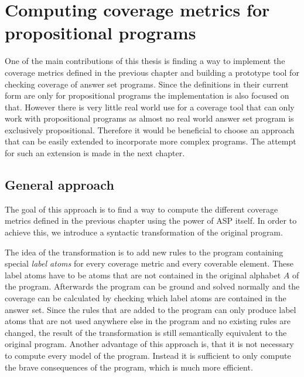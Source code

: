 \chapter{Computing coverage metrics for propositional programs}
\label{ch:Computing coverage metrics for propositional programs}
One of the main contributions of this thesis is finding a way to implement the coverage metrics defined in the previous chapter and building a prototype tool for checking coverage of answer set programs. Since the definitions in their current form are only for propositional programs the implementation is also focused on that. However there is very little real world use for a coverage tool that can only work with propositional programs as almost no real world answer set program is exclusively propositional. Therefore it would be beneficial to choose an approach that can be easily extended to incorporate more complex programs. The attempt for such an extension is made in the next chapter.

\begin{comment}
    - one of the main contributions of this thesis is finding a way to build a prototype tool for checking coverage of ASP programs based on the theoretic definitions of coverage described in the previous chapter.   \/
    
    - as the definitions are only applicable to propositional programs, those will be my focus for now. However such a tool would not be very practical so ideally an approach should be chosen that can easily be extended.    \/
    
    (maybe include a short history of what i tried but didnt work? -> meta programming with reify output)
\end{comment}

\section{General approach}
\label{sec:Computing coverage metrics for propositional programs/General approach}
The goal of this approach is to find a way to compute the different coverage metrics defined in the previous chapter using the power of ASP itself. In order to achieve this, we introduce a syntactic transformation of the original program. 

The idea of the transformation is to add new rules to the program containing special \emph{label atoms} for every coverage metric and every coverable element. These label atoms have to be atoms that are not contained in the original alphabet $A$ of the program. Afterwards the program can be ground and solved normally and the coverage can be calculated by checking which label atoms are contained in the answer set. Since the rules that are added to the program can only produce label atoms that are not used anywhere else in the program and no existing rules are changed, the result of the transformation is still semantically equivalent to the original program. Another advantage of this approach is, that it is not necessary to compute every model of the program. Instead it is sufficient to only compute the brave consequences of the program, which is much more efficient.

